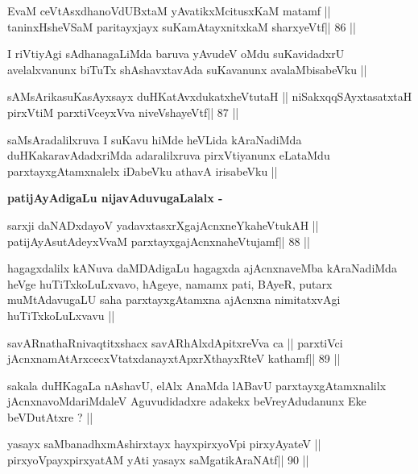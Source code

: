 \begin{shl}
EvaM ceVtAsxdhanoVdUBxtaM yAvatikxMcitusxKaM matamf ||
taninxHsheVSaM paritayxjayx suKamAtayxnitxkaM sharxyeVtf\hfill || 86 ||
\end{shl}

\begin{artha}
I riVtiyAgi sAdhanagaLiMda baruva yAvudeV oMdu suKavidadxrU
avelalxvanunx biTuTx shAshavxtavAda suKavanunx avalaMbisabeVku ||
\end{artha}

\begin{shl}
sAMsArikasuKasAyxsayx duHKatAvxdukatxheVtutaH ||
niSakxqqSAyxtasatxtaH pirxVtiM parxtiVceyxVva niveVshayeVtf\hfill || 87 ||
\end{shl}

\begin{artha}
saMsAradalilxruva I suKavu hiMde heVLida kAraNadiMda
duHKakaravAdadxriMda adaralilxruva pirxVtiyanunx eLataMdu
parxtayxgAtamxnalelx iDabeVku athavA irisabeVku ||
\end{artha}

\begin{artha}
\textbf{patijAyAdigaLu nijavAduvugaLalalx -}
\end{artha}

\begin{shl}
sarxji daNADxdayoV yadavxtasxrXgajAcnxneYkaheVtukAH ||
patijAyAsutAdeyxVvaM parxtayxgajAcnxnaheVtujamf\hfill || 88 ||
\end{shl}

\begin{artha}
hagagxdalilx kANuva daMDAdigaLu hagagxda ajAcnxnaveMba kAraNadiMda
heVge huTiTxkoLuLxvavo, hAgeye, namamx pati, BAyeR, putarx
muMtAdavugaLU saha parxtayxgAtamxna ajAcnxna nimitatxvAgi
huTiTxkoLuLxvavu ||
\end{artha}

\begin{shl}
savARnathaRnivaqtitxshacx savARhAlxdApitxreVva ca ||
parxtiVci jAcnxnamAtArxcecxVtatxdanayxtApxrXthayxRteV kathamf\hfill || 89 ||
\end{shl}

\begin{artha}
sakala duHKagaLa nAshavU, elAlx AnaMda lABavU parxtayxgAtamxnalilx
jAcnxnavoMdariMdaleV Aguvudidadxre adakekx beVreyAdudanunx Eke
beVDutAtxre ? || 
\end{artha}

\begin{shl}
yasayx saMbanadhxmAshirxtayx hayxpirxyoV\s pi pirxyAyateV ||
pirxyoV\s payxpirxyatAM yAti yasayx saMgatikAraNAtf\hfill || 90 ||
\end{shl}


